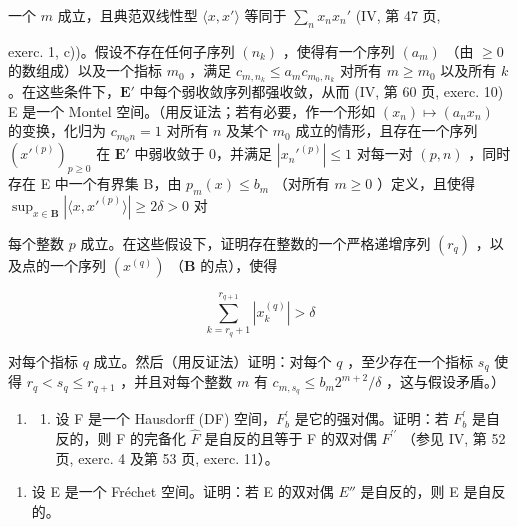 一个 \(m\) 成立，且典范双线性型 \(\langle x, x' \rangle\) 等同于 \(\sum_{n} x_n x_n'\) (IV, 第 47 页,

exerc. 1, c))。假设不存在任何子序列 \((n_k)\) ，使得有一个序列 \((a_m)\) （由 \(\geqslant 0\) 的数组成）以及一个指标 \(m_0\) ，满足 \(c_{m,n_k} \leqslant a_m c_{m_0,n_k}\) 对所有 \(m \geqslant m_0\) 以及所有 \(k\) 。在这些条件下，\(\mathbf{E}'\) 中每个弱收敛序列都强收敛，从而 (IV, 第 60 页, exerc. 10) E 是一个 Montel 空间。（用反证法；若有必要，作一个形如 \((x_n) \mapsto (a_n x_n)\) 的变换，化归为 \(c_{m_0 n} = 1\) 对所有 \(n\) 及某个 \(m_0\) 成立的情形，且存在一个序列 \((x'^{(p)})_{p \geqslant 0}\) 在 \(\mathbf{E}'\) 中弱收敛于 0，并满足 \(|x_n'^{(p)}| \leqslant 1\) 对每一对 \((p, n)\) ，同时存在 E 中一个有界集 B，由 \(p_m(x) \leqslant b_m\) （对所有 \(m \geqslant 0\) ）定义，且使得 \(\sup_{x \in \mathbf{B}} |\langle x, x'^{(p)} \rangle| \geqslant 2\delta > 0\) 对

每个整数 \(p\) 成立。在这些假设下，证明存在整数的一个严格递增序列 \((r_q)\) ，以及点的一个序列 \((x^{(q)})\) （\(\mathbf{B}\) 的点），使得

\[
\sum_ {k = r _ {q} + 1} ^ {r _ {q+1}} \left| x _ {k} ^ {(q)} \right| > \delta
\]

对每个指标 \(q\) 成立。然后（用反证法）证明：对每个 \(q\) ，至少存在一个指标 \(s_q\) 使得 \(r_q < s_q \leqslant r_{q+1}\) ，并且对每个整数 \(m\) 有 \(c_{m,s_q} \leqslant b_m 2^{m+2}/\delta\) ，这与假设矛盾。）

\begin{enumerate}
\def\labelenumi{\arabic{enumi})}
\setcounter{enumi}{11}
\tightlist
\item
  \begin{enumerate}
  \def\labelenumii{\alph{enumii})}
  \tightlist
  \item
    设 F 是一个 Hausdorff (DF) 空间，\(F_{b}^{\prime}\) 是它的强对偶。证明：若 \(F_{b}^{\prime}\) 是自反的，则 F 的完备化 \(\hat{F}\) 是自反的且等于 F 的双对偶 \(F^{\prime\prime}\) （参见 IV, 第 52 页, exerc. 4 及第 53 页, exerc. 11）。
  \end{enumerate}
\end{enumerate}

\begin{enumerate}
\def\labelenumi{\alph{enumi})}
\setcounter{enumi}{1}
\tightlist
\item
  设 E 是一个 Fréchet 空间。证明：若 E 的双对偶 \(E''\) 是自反的，则 E 是自反的。
\end{enumerate}

